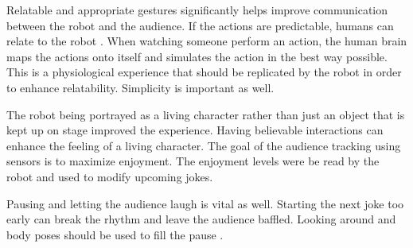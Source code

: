 \documentclass[onecolumn, draftclsnofoot,10pt, compsoc]{IEEEtran}
\begin{document}
Relatable and appropriate gestures significantly helps improve communication between the robot and the audience. If the actions are predictable, humans can relate to the robot {\cite{KnightEightLessons:2011}}.
When watching someone perform an action, the human brain maps the actions onto itself and simulates the action in the best way possible. This is a physiological experience that should be replicated by the robot in order to enhance relatability. Simplicity is important as well.

The robot being portrayed as a living character rather than just an object that is kept up on stage improved the experience. Having believable interactions can enhance the feeling of a living character.
The goal of the audience tracking using sensors is to maximize enjoyment. The enjoyment levels were be read by the robot and used to modify upcoming jokes.

Pausing and letting the audience laugh is vital as well. Starting the next joke too early can break the rhythm and leave the audience baffled. Looking around and body poses should be used to fill the pause {\cite{KnightEightLessons:2011}}.
\end{document}
